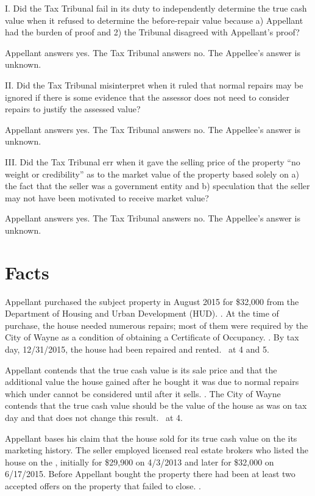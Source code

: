 \documentclass[12pt,\documentclassflag]{michiganCourtOfAppealsBrief}
\begin{document}
\noindent I. Did the Tax Tribunal fail in its duty to independently determine the true cash value when it refused to determine the before-repair value because a) Appellant had the burden of proof and 2) the Tribunal disagreed with Appellant's proof?

Appellant answers yes. The Tax Tribunal answers no. The Appellee's answer is unknown. 
\vspace{\baselineskip}

\noindent II. Did the Tax Tribunal misinterpret \mathieuGast when it ruled that normal repairs may be ignored if there is some evidence that the assessor does not need to consider repairs to justify the assessed value?

Appellant answers yes. The Tax Tribunal answers no. The Appellee's answer is unknown.

\vspace{\baselineskip}

\noindent III. Did the Tax Tribunal err when it gave the selling price of the property ``no weight or credibility'' as to the market value of the property based solely on a) the fact that the seller was a government entity and b) speculation that the seller may not have been motivated to receive market value?

Appellant answers yes. The Tax Tribunal answers no. The Appellee's answer is unknown. 
 
\newpage

\section{Facts}
Appellant purchased the subject property in August 2015 for \$32,000 from the Department of Housing and Urban Development (HUD). \mlsprintout. At the time of purchase, the house needed numerous repairs; most of them were required by the City of Wayne as a condition of obtaining a Certificate of Occupancy. \repairs. By tax day, 12/31/2015, the house had been repaired and rented. \See \FOJ\ at 4 and 5.

Appellant contends that the true cash value is its sale price and that the additional value the house gained after he bought it was due to normal repairs which under \mathieuGast cannot be considered until after it sells. \explanatoryLetter. The City of Wayne contends that the true cash value should be the value of the house as was on tax day and that \mathieuGast does not change this result. \FOJ\ at 4.

Appellant bases his claim that the house sold for its true cash value on the its marketing history. The seller employed licensed real estate brokers who listed the house on the \MLS, initially for \$29,900 on 4/3/2013 and later for \$32,000 on 6/17/2015. Before Appellant bought the property there had been at least two accepted offers on the property that failed to close. \mlsprintout.
\end{document}
